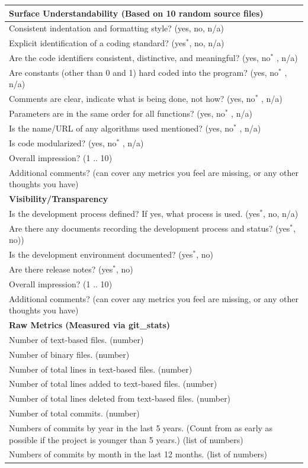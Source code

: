 \documentclass[letterpaper,cleveref]{lipics-v2019}
\begin{document}
\def\arraystretch{1.4}
\begin{tabular}{p{14cm}}
		\hline		
	\textbf{Surface Understandability (Based on 10 random source files)}\\
	\hline
	Consistent indentation and formatting style? ({yes, no, n/a})\\
	Explicit identification of a coding standard? ({yes$^*$, no, n/a})\\
	Are the code identifiers consistent, distinctive, and meaningful? ({yes, no$^*$ ,
	n/a})\\
	Are constants (other than 0 and 1) hard coded into the program? ({yes, no$^*$ ,
	n/a})\\
	Comments are clear, indicate what is being done, not how? ({yes, no$^*$ , n/a})\\
	Parameters are in the same order for all functions? ({yes, no$^*$ , n/a})\\
	Is the name/URL of any algorithms used mentioned? ({yes, no$^*$ , n/a})\\
	Is code modularized? ({yes, no$^*$ , n/a})\\
	Overall impression? ({1 .. 10})\\
	Additional comments? (can cover any metrics you feel are missing, or any other
	thoughts you have)\\
	\hline		
	\textbf{Visibility/Transparency}\\
	\hline
	Is the development process defined? If yes, what process is used. ({yes$^*$, no,
	n/a})\\
	Are there any documents recording the development process and status?  ({yes$^*$,
	no}))\\
	Is the development environment documented? ({yes$^*$, no})\\
	Are there release notes? ({yes$^*$, no})\\
	Overall impression? ({1 .. 10})\\
	Additional comments? (can cover any metrics you feel are missing, or any other
	thoughts you have)\\
		\hline		
	\textbf{Raw Metrics (Measured via git\_stats)}\\
	\hline
	Number of text-based files. (number)\\
	Number of binary files. (number)\\
	Number of total lines in text-based files. (number)\\
	Number of total lines added to text-based files. (number)\\
	Number of total lines deleted from text-based files. (number)\\
	Number of total commits. (number)\\
	Numbers of commits by year in the last 5 years. (Count from as early as
	possible if the project is younger than 5 years.) (list of numbers)\\
	Numbers of commits by month in the last 12 months. (list of numbers)\\
	\hline
\end{tabular}
\end{document}
